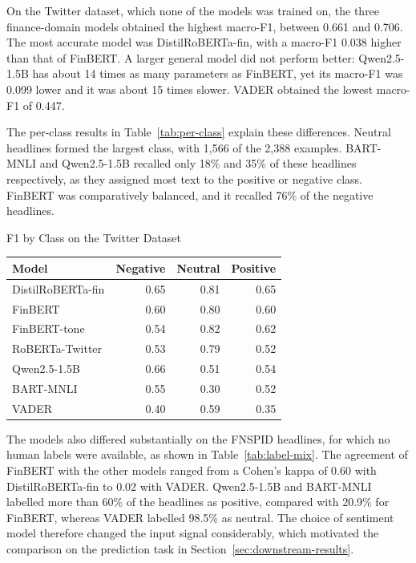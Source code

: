 On the Twitter dataset, which none of the models was trained on, the three finance-domain models obtained the highest macro-F1, between 0.661 and 0.706. The most accurate model was DistilRoBERTa-fin, with a macro-F1 0.038 higher than that of FinBERT. A larger general model did not perform better: Qwen2.5-1.5B has about 14 times as many parameters as FinBERT, yet its macro-F1 was 0.099 lower and it was about 15 times slower. VADER obtained the lowest macro-F1 of 0.447.

The per-class results in Table~\ref{tab:per-class} explain these differences. Neutral headlines formed the largest class, with 1,566 of the 2,388 examples. BART-MNLI and Qwen2.5-1.5B recalled only 18\% and 35\% of these headlines respectively, as they assigned most text to the positive or negative class. FinBERT was comparatively balanced, and it recalled 76\% of the negative headlines.

\begin{utptable}{F1 by Class on the Twitter Dataset}
\label{tab:per-class}
\begin{tabular}{@{}lrrr@{}}
\toprule
\textbf{Model} & \textbf{Negative} & \textbf{Neutral} & \textbf{Positive} \\
\midrule
DistilRoBERTa-fin & 0.65 & 0.81 & 0.65 \\
FinBERT & 0.60 & 0.80 & 0.60 \\
FinBERT-tone & 0.54 & 0.82 & 0.62 \\
RoBERTa-Twitter & 0.53 & 0.79 & 0.52 \\
Qwen2.5-1.5B & 0.66 & 0.51 & 0.54 \\
BART-MNLI & 0.55 & 0.30 & 0.52 \\
VADER & 0.40 & 0.59 & 0.35 \\
\bottomrule
\end{tabular}
\end{utptable}

The models also differed substantially on the FNSPID headlines, for which no human labels were available, as shown in Table~\ref{tab:label-mix}. The agreement of FinBERT with the other models ranged from a Cohen's kappa of 0.60 with DistilRoBERTa-fin to 0.02 with VADER. Qwen2.5-1.5B and BART-MNLI labelled more than 60\% of the headlines as positive, compared with 20.9\% for FinBERT, whereas VADER labelled 98.5\% as neutral. The choice of sentiment model therefore changed the input signal considerably, which motivated the comparison on the prediction task in Section~\ref{sec:downstream-results}.

